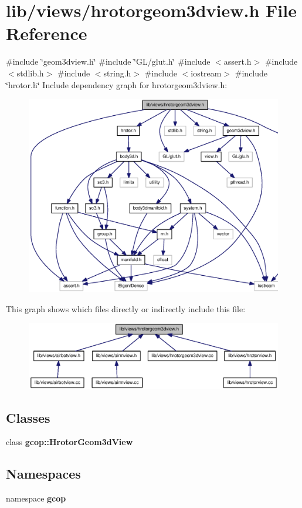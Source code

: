 \section{lib/views/hrotorgeom3dview.h \-File \-Reference}
\label{hrotorgeom3dview_8h}
{\ttfamily \#include \char`\"{}geom3dview.\-h\char`\"{}}\*
{\ttfamily \#include \char`\"{}\-G\-L/glut.\-h\char`\"{}}\*
{\ttfamily \#include $<$assert.\-h$>$}\*
{\ttfamily \#include $<$stdlib.\-h$>$}\*
{\ttfamily \#include $<$string.\-h$>$}\*
{\ttfamily \#include $<$iostream$>$}\*
{\ttfamily \#include \char`\"{}hrotor.\-h\char`\"{}}\*
\-Include dependency graph for hrotorgeom3dview.\-h\-:\nopagebreak
\begin{figure}[H]
\begin{center}
\leavevmode
\includegraphics[width=350pt]{hrotorgeom3dview_8h__incl}
\end{center}
\end{figure}
\-This graph shows which files directly or indirectly include this file\-:\nopagebreak
\begin{figure}[H]
\begin{center}
\leavevmode
\includegraphics[width=350pt]{hrotorgeom3dview_8h__dep__incl}
\end{center}
\end{figure}
\subsection*{\-Classes}
\begin{DoxyCompactItemize}
\item 
class {\bf gcop\-::\-Hrotor\-Geom3d\-View}
\end{DoxyCompactItemize}
\subsection*{\-Namespaces}
\begin{DoxyCompactItemize}
\item 
namespace {\bf gcop}
\end{DoxyCompactItemize}
